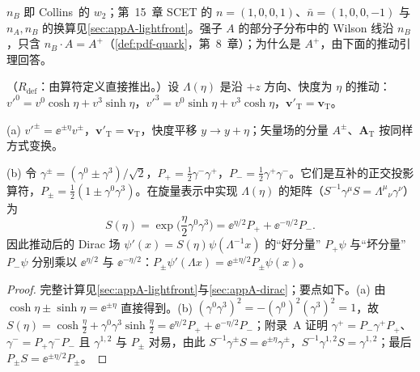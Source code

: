 $n_B$ 即 Collins~\cite{Collins2011}的 $w_2$；第~15~章 SCET 的 $n=(1,0,0,1)$、$\bar n=(1,0,0,-1)$ 与 $n_A,n_B$ 的换算见\cref{sec:appA-lightfront}。强子 $A$ 的部分子分布中的 Wilson 线沿 $n_B$，只含 $n_B\cdot A=A^+$（\cref{def:pdf-quark}，第~8~章）；为什么是 $A^+$，由下面的推动引理回答。

\begin{lemma}\label{lem:prelim-boost}
（$R_{\mathrm{def}}$：由算符定义直接推出。）设 $\Lambda(\eta)$ 是沿 $+z$ 方向、快度为 $\eta$ 的推动：$v'^0=v^0\cosh\eta+v^3\sinh\eta$，$v'^3=v^0\sinh\eta+v^3\cosh\eta$，$\mathbf v'_{\mathrm T}=\mathbf v_{\mathrm T}$。
\par
(a) $v'^\pm=\ee^{\pm\eta}v^\pm$，$\mathbf v'_{\mathrm T}=\mathbf v_{\mathrm T}$，快度平移 $y\to y+\eta$；矢量场的分量 $A^\pm$、$\mathbf A_{\mathrm T}$ 按同样方式变换。
\par
(b) 令 $\gamma^\pm=(\gamma^0\pm\gamma^3)/\sqrt2$，$P_+=\frac12\gamma^-\gamma^+$，$P_-=\frac12\gamma^+\gamma^-$。它们是互补的正交投影算符，$P_\pm=\frac12(1\pm\gamma^0\gamma^3)$。在旋量表示中实现 $\Lambda(\eta)$ 的矩阵（$S^{-1}\gamma^\mu S=\Lambda^\mu{}_\nu\gamma^\nu$）为
\begin{equation}\label{eq:prelim-boost-spinor}
S(\eta)=\exp\Big(\frac\eta2\gamma^0\gamma^3\Big)=\ee^{\eta/2}P_++\ee^{-\eta/2}P_- .
\end{equation}
因此推动后的 Dirac 场 $\psi'(x)=S(\eta)\psi(\Lambda^{-1}x)$ 的“好分量” $P_+\psi$ 与“坏分量” $P_-\psi$ 分别乘以 $\ee^{\eta/2}$ 与 $\ee^{-\eta/2}$：$P_\pm\psi'(\Lambda x)=\ee^{\pm\eta/2}P_\pm\psi(x)$。
\end{lemma}

\begin{proof}
完整计算见\cref{sec:appA-lightfront}与\cref{sec:appA-dirac}；要点如下。(a) 由 $\cosh\eta\pm\sinh\eta=\ee^{\pm\eta}$ 直接得到。(b) $(\gamma^0\gamma^3)^2=-(\gamma^0)^2(\gamma^3)^2=1$，故 $S(\eta)=\cosh\frac\eta2+\gamma^0\gamma^3\sinh\frac\eta2=\ee^{\eta/2}P_++\ee^{-\eta/2}P_-$；附录~A 证明 $\gamma^+=P_-\gamma^+P_+$、$\gamma^-=P_+\gamma^-P_-$ 且 $\gamma^{1,2}$ 与 $P_\pm$ 对易，由此 $S^{-1}\gamma^\pm S=\ee^{\pm\eta}\gamma^\pm$，$S^{-1}\gamma^{1,2}S=\gamma^{1,2}$；最后 $P_\pm S=\ee^{\pm\eta/2}P_\pm$。
\end{proof}

